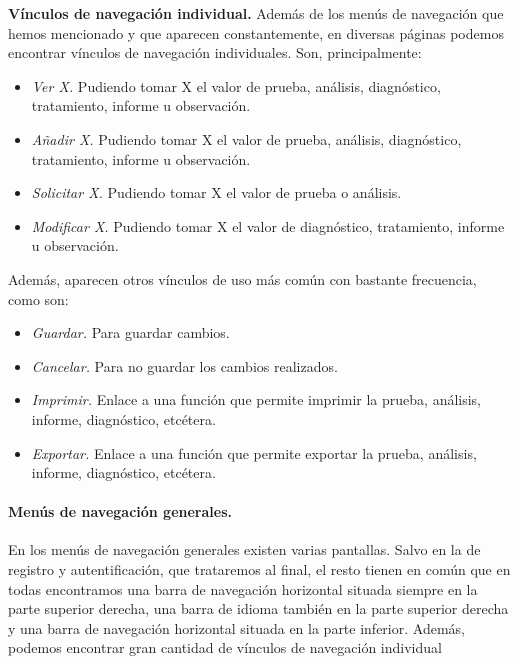 \documentclass[a4paper,oneside,11pt]{book}
\begin{document}
		\textbf{Vínculos de navegación individual.} Además de los menús de navegación que hemos mencionado y que aparecen constantemente, en diversas páginas podemos encontrar vínculos de navegación individuales. Son, principalmente:
		\begin{itemize}
			\item \textit{Ver X.} Pudiendo tomar X el valor de prueba, análisis, diagnóstico, tratamiento, informe u observación.
			\item \textit{Añadir X.}  Pudiendo tomar X el valor de prueba, análisis, diagnóstico, tratamiento, informe u observación.
			\item \textit{Solicitar X.}  Pudiendo tomar X el valor de prueba o análisis.
			\item \textit{Modificar X.} Pudiendo tomar X el valor de diagnóstico, tratamiento, informe u observación.			
		\end{itemize}
		
		Además, aparecen otros vínculos de uso más común con bastante frecuencia, como son:
		\begin{itemize}
			\item \textit{Guardar.} Para guardar cambios.
			\item \textit{Cancelar.} Para no guardar los cambios realizados.
			\item \textit{Imprimir.} Enlace a una función que permite imprimir la prueba, análisis, informe, diagnóstico, etcétera. 
			\item \textit{Exportar.} Enlace a una función que permite exportar la prueba, análisis, informe, diagnóstico, etcétera.
		\end{itemize}
		
		
		
		\paragraph{Menús de navegación generales.} %
		\label{par:nav_menus_de_navegacion_generales}
		
		En los menús de navegación generales existen varias pantallas. Salvo en la de registro y autentificación, que trataremos al final, el resto tienen en común que en todas encontramos una barra de navegación horizontal situada siempre en la parte superior derecha, una barra de idioma también en la parte superior derecha y una barra de navegación horizontal situada en la parte inferior. Además, podemos encontrar gran cantidad de vínculos de navegación individual
		
\end{document}

